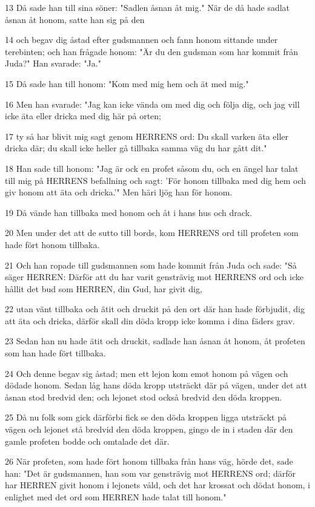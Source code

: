 \par 13 Då sade han till sina söner: "Sadlen åsnan åt mig." När de då hade sadlat åsnan åt honom, satte han sig på den
\par 14 och begav dig åstad efter gudsmannen och fann honom sittande under terebinten; och han frågade honom: "Är du den gudsman som har kommit från Juda?" Han svarade: "Ja."
\par 15 Då sade han till honom: "Kom med mig hem och ät med mig."
\par 16 Men han svarade: "Jag kan icke vända om med dig och följa dig, och jag vill icke äta eller dricka med dig här på orten;
\par 17 ty så har blivit mig sagt genom HERRENS ord: Du skall varken äta eller dricka där; du skall icke heller gå tillbaka samma väg du har gått dit."
\par 18 Han sade till honom: "Jag är ock en profet såsom du, och en ängel har talat till mig på HERRENS befallning och sagt: 'För honom tillbaka med dig hem och giv honom att äta och dricka.'" Men häri ljög han för honom.
\par 19 Då vände han tillbaka med honom och åt i hans hus och drack.
\par 20 Men under det att de sutto till bords, kom HERRENS ord till profeten som hade fört honom tillbaka.
\par 21 Och han ropade till gudsmannen som hade kommit från Juda och sade: "Så säger HERREN: Därför att du har varit gensträvig mot HERRENS ord och icke hållit det bud som HERREN, din Gud, har givit dig,
\par 22 utan vänt tillbaka och ätit och druckit på den ort där han hade förbjudit, dig att äta och dricka, därför skall din döda kropp icke komma i dina fäders grav.
\par 23 Sedan han nu hade ätit och druckit, sadlade han åsnan åt honom, åt profeten som han hade fört tillbaka.
\par 24 Och denne begav sig åstad; men ett lejon kom emot honom på vägen och dödade honom. Sedan låg hans döda kropp utsträckt där på vägen, under det att åsnan stod bredvid den; och lejonet stod också bredvid den döda kroppen.
\par 25 Då nu folk som gick därförbi fick se den döda kroppen ligga utsträckt på vägen och lejonet stå bredvid den döda kroppen, gingo de in i staden där den gamle profeten bodde och omtalade det där.
\par 26 När profeten, som hade fört honom tillbaka från hans väg, hörde det, sade han: "Det är gudsmannen, han som var gensträvig mot HERRENS ord; därför har HERREN givit honom i lejonets våld, och det har krossat och dödat honom, i enlighet med det ord som HERREN hade talat till honom."
